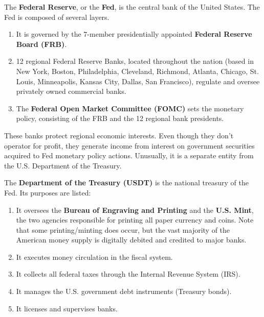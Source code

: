 \documentclass{article}
\begin{document}
    \begin{definition}
      The \textbf{Federal Reserve}, or the \textbf{Fed}, is the central bank of the United States. The Fed is composed of several layers. 
      \begin{enumerate}
        \item It is governed by the 7-member presidentially appointed \textbf{Federal Reserve Board (FRB)}. 
        \item 12 regional Federal Reserve Banks, located throughout the nation (based in New York, Boston, Philadelphia, Cleveland, Richmond, Atlanta, Chicago, St. Louis, Minneapolis, Kansas City, Dallas, San Francisco), regulate and oversee privately owned commercial banks. 
        \item The \textbf{Federal Open Market Committee (FOMC)} sets the monetary policy, consisting of the FRB and the 12 regional bank presidents. 
      \end{enumerate}
      These banks protect regional economic interests. Even though they don't operator for profit, they generate income from interest on government securities acquired to Fed monetary policy actions. Unusually, it is a separate entity from the U.S. Department of the Treasury. 
    \end{definition}

    \begin{definition}
      The \textbf{Department of the Treasury (USDT)} is the national treasury of the Fed. Its purposes are listed: 
      \begin{enumerate}
        \item It oversees the \textbf{Bureau of Engraving and Printing} and the \textbf{U.S. Mint}, the two agencies responsible for printing all paper currency and coins. Note that some printing/minting does occur, but the vast majority of the American money supply is digitally debited and credited to major banks. 
        \item It executes money circulation in the fiscal system. 
        \item It collects all federal taxes through the Internal Revenue System (IRS). 
        \item It manages the U.S. government debt instruments (Treasury bonds). 
        \item It licenses and supervises banks. 
      \end{enumerate}
    \end{definition}
\end{document}
